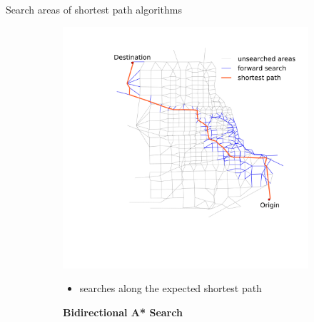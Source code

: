 \documentclass[final]{beamer}
\begin{document}
\begin{frame}{ }
\begin{columns}[t]
\begin{column}{.4\linewidth}
\begin{block}{Search areas of shortest path algorithms}
\begin{figure}
\begin{subfigure}{.5\linewidth}
                        \includegraphics[width=\linewidth,trim=120px 280px 48px 60px,clip]{img/astar}
                        \begin{itemize}
                        \centering
                            \item searches \alert{along the expected} shortest path
                        \end{itemize}
                    \end{subfigure}%
                    \begin{subfigure}{.5\linewidth}
                        \vspace{1.3em}
                        \centering
                        {\bfseries Bidirectional A* Search}

\end{subfigure}
\end{figure}
\end{block}
\end{column}
\end{columns}
\end{frame}
\end{document}
